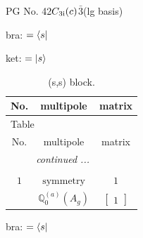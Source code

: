 \documentclass[fleqn,8pt,landscape]{jsarticle}
\begin{document}
\setcounter{MaxMatrixCols}{32}

\renewcommand{\tablename}{Table~}
\renewcommand{\figurename}{Figure~}
\begin{center}
\LARGE
PG No. 42\quad$C_{\rm 3i}(c)$\quad$\bar{3}$\quad[ trigonal ] (lg basis)
\end{center}
bra: $=\bra{s}$

\noindent
ket: $=\ket{s}$
\renewcommand{\arraystretch}{1.6}
\begin{longtable}{ccc}
\caption{(s,s) block.}
 \\
 \hline \hline
No. & multipole & matrix \\ \hline \endfirsthead

\multicolumn{2}{l}{\tablename\ \thetable{}} \\
 \hline \hline
No. & multipole & matrix \\ \hline \endhead

 \hline \hline
\multicolumn{2}{r}{\footnotesize\it continued ...} \\ \endfoot

 \hline \hline
\multicolumn{2}{r}{} \\ \endlastfoot

$ 1 $ & $ \text{symmetry} $ & $ 1 $ \\
$  $ & $ \mathbb{Q}_{0}^{(a)}(A_{g}) $ & $ \begin{bmatrix} 1 \end{bmatrix} $ \\ \hline
\end{longtable}
bra: $=\bra{s}$
\end{document}
